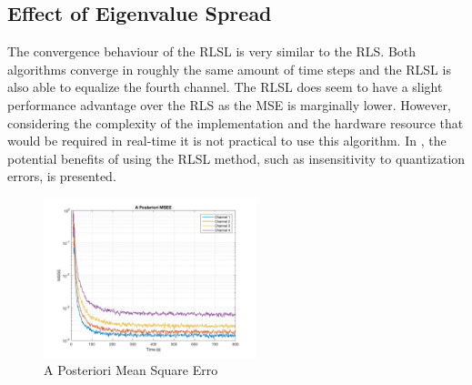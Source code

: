 \documentclass[journal]{IEEEtran}
\begin{document}
\subsection{Effect of Eigenvalue Spread}
The convergence behaviour of the RLSL is very similar to the RLS. Both algorithms converge in roughly the
same amount of time steps and the RLSL is also able to equalize the fourth channel. The RLSL does seem to have a
slight performance advantage over the RLS as the MSE is marginally lower. However, considering the complexity of the implementation
and the hardware resource that would be required in real-time it is not practical to use this algorithm. In \cite{satorius1981application}, the potential benefits of using
the RLSL method, such as insensitivity to quantization errors, is presented.
\begin{figure}[H]
  \centering
  \captionsetup{justification=centering,font = small}
  \includegraphics[width=0.55\textwidth, inner] {Plots/Project3_MSEE.jpg}
  \caption{A Posteriori Mean Square Erro}
    \label{fig:MSEEp}
\end{figure}
\end{document}
